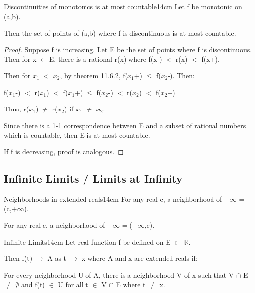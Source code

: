     \begin{wtheorem}{Discontinuities of monotonics is at most countable}{14cm}
        Let f be monotonic on (a,b).

        Then the set of points of (a,b) where f is discontinuous is
        at most countable.
    \end{wtheorem}

    \begin{proof}
        Suppose f is increasing.
        Let E be the set of points where f is discontinuous.
        Then for x $\in$ E, there is a rational r(x) where
        f(x-) $<$ r(x) $<$ f(x+).
        
        Then for $x_1$ $<$ $x_2$, by {\color{red} theorem 11.6.2},
        f($x_1$+) $\leq$ f($x_2$-). Then:

        \hspace{1cm}
        f($x_1$-) $<$ r($x_1$) $<$ f($x_1$+)
        $\leq$ f($x_2$-) $<$ r($x_2$) $<$ f($x_2$+)

        Thus, r($x_1$) $\not =$ r($x_2$) if $x_1$ $\not =$ $x_2$.

        Since there is a 1-1 correspondence between E and a subset
        of rational numbers which is countable, then E is at most countable.

        If f is decreasing, proof is analogous.
    \end{proof}

    \vspace{0.5cm}





\subsection{ Infinite Limits / Limits at Infinity }

    \begin{definition}{Neighborhoods in extended reals}{14cm}
        For any real c, a neighborhood of $+\infty$ = (c,$+\infty$).

        For any real c, a neighborhood of $-\infty$ = ($-\infty$,c).        
    \end{definition}

    \vspace{0.5cm}



    \begin{definition}{Infinite Limits}{14cm}
        Let real function f be defined on E $\subset$ $\mathbb{R}$.

        Then f(t) $\rightarrow$ A as t $\rightarrow$ x where A and x
        are extended reals if:
        
        \begin{adjustbox}{minipage=13cm, right, vspace=0.1cm 0cm}
            For every neighborhood U of A,
            there is a neighborhood V of x such that V $\cap$ E $\not =$ $\emptyset$
            and f(t) $\in$ U for all t $\in$ V $\cap$ E where t $\not =$ x.
        \end{adjustbox}        
    \end{definition}

